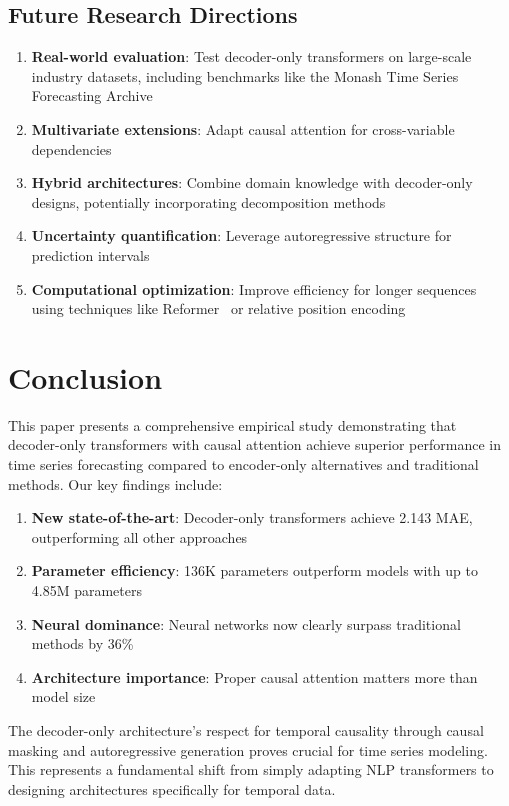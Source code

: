\documentclass[11pt]{article}
\begin{document}
\subsection{Future Research Directions}

\begin{enumerate}
\item \textbf{Real-world evaluation}: Test decoder-only transformers on large-scale industry datasets, including benchmarks like the Monash Time Series Forecasting Archive~\cite{godahewa2021monash}
\item \textbf{Multivariate extensions}: Adapt causal attention for cross-variable dependencies
\item \textbf{Hybrid architectures}: Combine domain knowledge with decoder-only designs, potentially incorporating decomposition methods~\cite{cleveland1990stl}
\item \textbf{Uncertainty quantification}: Leverage autoregressive structure for prediction intervals
\item \textbf{Computational optimization}: Improve efficiency for longer sequences using techniques like Reformer~\cite{kitaev2020reformer} or relative position encoding~\cite{shaw2018self}
\end{enumerate}

\section{Conclusion}

This paper presents a comprehensive empirical study demonstrating that decoder-only transformers with causal attention achieve superior performance in time series forecasting compared to encoder-only alternatives and traditional methods. Our key findings include:

\begin{enumerate}
\item \textbf{New state-of-the-art}: Decoder-only transformers achieve 2.143 MAE, outperforming all other approaches
\item \textbf{Parameter efficiency}: 136K parameters outperform models with up to 4.85M parameters
\item \textbf{Neural dominance}: Neural networks now clearly surpass traditional methods by 36\%
\item \textbf{Architecture importance}: Proper causal attention matters more than model size
\end{enumerate}

The decoder-only architecture's respect for temporal causality through causal masking and autoregressive generation proves crucial for time series modeling. This represents a fundamental shift from simply adapting NLP transformers to designing architectures specifically for temporal data.
\end{document}
